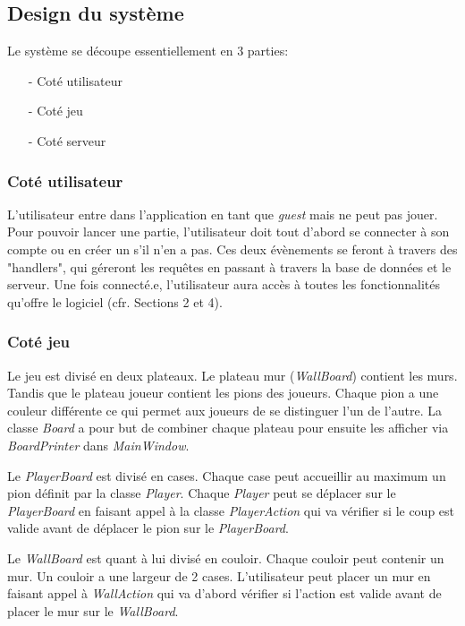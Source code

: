 \subsection{Design du système}
    Le système se découpe essentiellement en 3 parties:
    \begin{itemize}
        \item[-] Coté utilisateur
        \item[-] Coté jeu
        \item[-] Coté serveur
    \end{itemize}
    \subsubsection{Coté utilisateur}
        L'utilisateur entre dans l'application en tant que \textit{guest} mais ne peut pas jouer.
        Pour pouvoir lancer une partie, l'utilisateur doit tout d'abord se connecter à son compte ou en créer un s'il n'en a pas. Ces deux évènements se feront à travers des "handlers", qui géreront les requêtes en passant à travers la base de données et le serveur. Une fois connecté.e, l'utilisateur aura accès à toutes les fonctionnalités qu'offre le logiciel (cfr. Sections 2 et 4).
    \subsubsection{Coté jeu}
        Le jeu est divisé en deux plateaux. Le plateau mur (\textit{WallBoard}) contient les murs. Tandis que le plateau joueur contient les pions des joueurs. Chaque pion a une couleur différente ce qui permet aux joueurs de se distinguer l'un de l'autre. La classe \textit{Board} a pour but de combiner chaque plateau pour ensuite les afficher via \textit{BoardPrinter} dans \textit{MainWindow}.

        Le \textit{PlayerBoard} est divisé en cases. Chaque case peut accueillir au maximum un pion définit par la classe \textit{Player}. Chaque \textit{Player} peut se déplacer sur le \textit{PlayerBoard} en faisant appel à la classe \textit{PlayerAction} qui va vérifier si le coup est valide avant de déplacer le pion sur le \textit{PlayerBoard}.

        Le \textit{WallBoard} est quant à lui divisé en couloir. Chaque couloir peut contenir un mur. Un couloir a une largeur de 2 cases.
        L'utilisateur peut placer un mur en faisant appel à \textit{WallAction} qui va d'abord vérifier si l'action est valide avant de placer le mur sur le \textit{WallBoard}.
